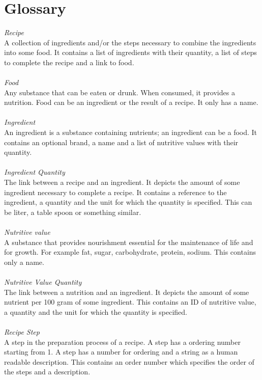 \section{Glossary}
\textit{Recipe} \\
A collection of ingredients and/or the steps necessary to combine the ingredients into some food. It contains a list of ingredients with their quantity, a list of steps to complete the recipe and a link to food. \\ \\
\textit{Food} \\
Any substance that can be eaten or drunk. When consumed, it provides a nutrition. Food can be an ingredient or the result of a recipe. It only has a name. \\ \\
\textit{Ingredient} \\
An ingredient is a substance containing nutrients; an ingredient can be a food. It contains an optional brand, a name and a list of nutritive values with their quantity. \\ \\
\textit{Ingredient Quantity} \\
The link between a recipe and an ingredient. 
It depicts the amount of some ingredient necessary to complete a recipe.
It contains a reference to the ingredient, a quantity and the unit for which the quantity is specified. This can be liter, a table spoon or something similar.
\\ \\
\textit{Nutritive value} \\
A substance that provides nourishment essential for the maintenance of life and for growth. For example fat, sugar, carbohydrate, protein, sodium. This contains only a name. \\ \\
\textit{Nutritive Value Quantity} \\
The link between a nutrition and an ingredient. 
It depicts the amount of some nutrient per 100 gram of some ingredient. This contains an ID of nutritive value, a quantity and the unit for which the quantity is specified.\\ \\
\textit{Recipe Step} \\
A step in the preparation process of a recipe. A step has a ordering number starting from 1. A step has a number for ordering and a string as a human readable description. This contains an order number which specifies the order of the steps and a description.



